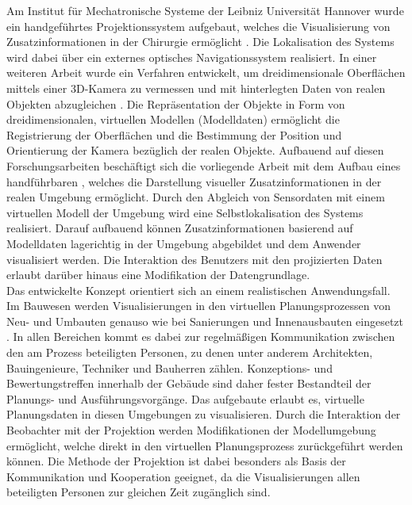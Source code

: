 Am Institut für Mechatronische Systeme der Leibniz Universität Hannover wurde ein handgeführtes Projektionssystem aufgebaut, welches die Visualisierung von Zusatzinformationen in der Chirurgie ermöglicht \cite{Kobler2010}. Die Lokalisation des Systems wird dabei über ein externes optisches Navigationssystem realisiert. In einer weiteren Arbeit wurde ein Verfahren entwickelt, um dreidimensionale Oberflächen mittels einer 3D-Kamera zu vermessen und mit hinterlegten Daten von realen Objekten abzugleichen \cite{Reese2013}. Die Repräsentation der Objekte in Form von dreidimensionalen, virtuellen Modellen (Modelldaten) ermöglicht die Registrierung der Oberflächen und die Bestimmung der Position und Orientierung der Kamera bezüglich der realen Objekte. Aufbauend auf diesen Forschungsarbeiten beschäftigt sich die vorliegende Arbeit mit dem Aufbau eines handführbaren , welches die Darstellung visueller Zusatzinformationen in der realen Umgebung ermöglicht. Durch den Abgleich von Sensordaten mit einem virtuellen Modell der Umgebung wird eine Selbstlokalisation des Systems realisiert. Darauf aufbauend können Zusatzinformationen basierend auf Modelldaten lagerichtig in der Umgebung abgebildet und dem Anwender visualisiert werden. Die Interaktion des Benutzers mit den projizierten Daten erlaubt darüber hinaus eine Modifikation der Datengrundlage.\\

Das entwickelte Konzept orientiert sich an einem realistischen Anwendungsfall. Im Bauwesen werden Visualisierungen in den virtuellen Planungsprozessen von Neu- und Umbauten genauso wie bei Sanierungen und Innenausbauten eingesetzt \cite{Bouchlaghem2005}. In allen Bereichen kommt es dabei zur regelmäßigen Kommunikation zwischen den am Prozess beteiligten Personen, zu denen unter anderem Architekten, Bauingenieure, Techniker und Bauherren zählen. Konzeptions- und Bewertungstreffen innerhalb der Gebäude sind daher fester Bestandteil der Planungs- und Ausführungsvorgänge. Das aufgebaute \kps{} erlaubt es, virtuelle Planungsdaten in diesen Umgebungen zu visualisieren. Durch die Interaktion der Beobachter mit der Projektion werden Modifikationen der Modellumgebung ermöglicht, welche direkt in den virtuellen Planungsprozess zurückgeführt werden können. Die Methode der Projektion ist dabei besonders als Basis der Kommunikation und Kooperation geeignet, da die Visualisierungen allen beteiligten Personen zur gleichen Zeit zugänglich sind.\\

